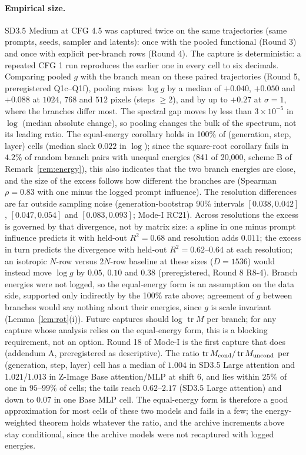 \documentclass[11pt]{article}
\theoremstyle{definition}
\newcommand{\tr}{\operatorname{tr}}
\begin{document}
\paragraph{Empirical size.} SD3.5 Medium at CFG 4.5 was captured twice on the same trajectories (same prompts, seeds, sampler and latents): once with the pooled functional (Round 3) and once with explicit per-branch rows (Round 4). The capture is deterministic: a repeated CFG 1 run reproduces the earlier one in every cell to six decimals. Comparing pooled $g$ with the branch mean on these paired trajectories (Round 5, preregistered Q1c--Q1f), pooling raises $\log g$ by a median of $+0.040$, $+0.050$ and $+0.088$ at $1024$, $768$ and $512$ pixels (steps $\ge2$), and by up to $+0.27$ at $\sigma=1$, where the branches differ most. The spectral gap moves by less than $3\times10^{-5}$ in $\log$ (median absolute change), so pooling changes the bulk of the spectrum, not its leading ratio. The equal-energy corollary holds in 100\% of (generation, step, layer) cells (median slack $0.022$ in $\log$); since the square-root corollary fails in $4.2\%$ of random branch pairs with unequal energies (841 of 20{,}000, scheme B of Remark~\ref{rem:energy}), this also indicates that the two branch energies are close, and the size of the excess follows how different the branches are (Spearman $\rho=0.83$ with one minus the logged prompt influence). The resolution differences are far outside sampling noise (generation-bootstrap 90\% intervals $[0.038,0.042]$, $[0.047,0.054]$ and $[0.083,0.093]$; Mode-I RC21). Across resolutions the excess is governed by that divergence, not by matrix size: a spline in one minus prompt influence predicts it with held-out $R^2=0.68$ and resolution adds $0.011$; the excess in turn predicts the divergence with held-out $R^2=0.62$--$0.64$ at each resolution; an isotropic $N$-row versus $2N$-row baseline at these sizes ($D=1536$) would instead move $\log g$ by $0.05$, $0.10$ and $0.38$ (preregistered, Round 8 R8-4). Branch energies were not logged, so the equal-energy form is an assumption on the data side, supported only indirectly by the 100\% rate above; agreement of $g$ between branches would say nothing about their energies, since $g$ is scale invariant (Lemma~\ref{lem:rot}(i)). Future captures should log $\tr M$ per branch; for any capture whose analysis relies on the equal-energy form, this is a blocking requirement, not an option. Round 18 of Mode-I is the first capture that does (addendum A, preregistered as descriptive). The ratio $\tr M_{\rm cond}/\tr M_{\rm uncond}$ per (generation, step, layer) cell has a median of $1.004$ in SD3.5 Large attention and $1.021$/$1.013$ in Z-Image Base attention/MLP at shift 6, and lies within $25\%$ of one in $95$--$99\%$ of cells; the tails reach $0.62$--$2.17$ (SD3.5 Large attention) and down to $0.07$ in one Base MLP cell. The equal-energy form is therefore a good approximation for most cells of these two models and fails in a few; the energy-weighted theorem holds whatever the ratio, and the archive increments above stay conditional, since the archive models were not recaptured with logged energies.
\end{document}
